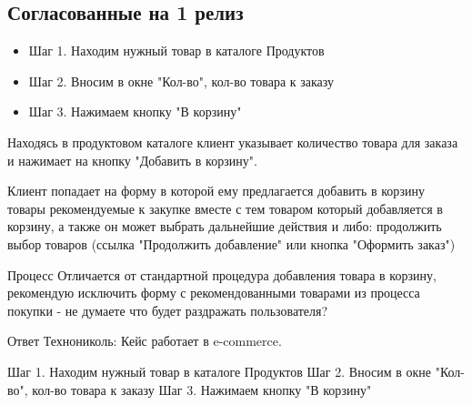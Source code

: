 \subsection{Согласованные на 1 релиз}
\fi
{}
{


\begin{wiki}
\begin{itemize}
\item Шаг 1. Находим нужный товар в каталоге Продуктов
\item Шаг 2. Вносим в окне "Кол-во", кол-во товара к заказу
\item Шаг 3. Нажимаем кнопку "В корзину"
\end{itemize}

Находясь в продуктовом каталоге клиент указывает количество товара для заказа и нажимает на кнопку "Добавить в корзину". 

Клиент попадает на форму в которой ему предлагается добавить в корзину товары рекомендуемые к закупке вместе с тем товаром который добавляется в корзину, а также он может выбрать дальнейшие действия и либо: продолжить выбор товаров (ссылка "Продолжить добавление" или кнопка "Оформить заказ")
\end{wiki}

\begin{hybris}
Процесс Отличается от стандартной процедура добавления товара в корзину, рекомендую исключить форму с рекомендованными товарами из процесса покупки - не думаете что будет раздражать пользователя?

Ответ Технониколь: Кейс работает в e-commerce.
\end{hybris}


\begin{itogo}
Шаг 1. Находим нужный товар в каталоге Продуктов
Шаг 2. Вносим в окне "Кол-во", кол-во товара к заказу
Шаг 3. Нажимаем кнопку "В корзину"
\end{itogo}



}
